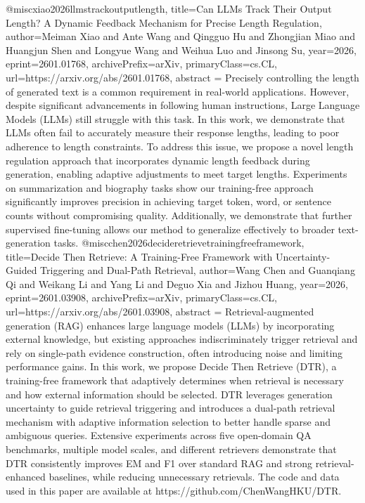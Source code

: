 {}@misc{xiao2026llmstrackoutputlength,
      title={Can LLMs Track Their Output Length? A Dynamic Feedback Mechanism for Precise Length Regulation}, 
      author={Meiman Xiao and Ante Wang and Qingguo Hu and Zhongjian Miao and Huangjun Shen and Longyue Wang and Weihua Luo and Jinsong Su},
      year={2026},
      eprint={2601.01768},
      archivePrefix={arXiv},
      primaryClass={cs.CL},
      url={https://arxiv.org/abs/2601.01768},
      abstract = {Precisely controlling the length of generated text is a common requirement in real-world applications. However, despite significant advancements in following human instructions, Large Language Models (LLMs) still struggle with this task. In this work, we demonstrate that LLMs often fail to accurately measure their response lengths, leading to poor adherence to length constraints. To address this issue, we propose a novel length regulation approach that incorporates dynamic length feedback during generation, enabling adaptive adjustments to meet target lengths. Experiments on summarization and biography tasks show our training-free approach significantly improves precision in achieving target token, word, or sentence counts without compromising quality. Additionally, we demonstrate that further supervised fine-tuning allows our method to generalize effectively to broader text-generation tasks.}
}@misc{chen2026decideretrievetrainingfreeframework,
      title={Decide Then Retrieve: A Training-Free Framework with Uncertainty-Guided Triggering and Dual-Path Retrieval}, 
      author={Wang Chen and Guanqiang Qi and Weikang Li and Yang Li and Deguo Xia and Jizhou Huang},
      year={2026},
      eprint={2601.03908},
      archivePrefix={arXiv},
      primaryClass={cs.CL},
      url={https://arxiv.org/abs/2601.03908},
      abstract = {Retrieval-augmented generation (RAG) enhances large language models (LLMs) by incorporating external knowledge, but existing approaches indiscriminately trigger retrieval and rely on single-path evidence construction, often introducing noise and limiting performance gains. In this work, we propose Decide Then Retrieve (DTR), a training-free framework that adaptively determines when retrieval is necessary and how external information should be selected. DTR leverages generation uncertainty to guide retrieval triggering and introduces a dual-path retrieval mechanism with adaptive information selection to better handle sparse and ambiguous queries. Extensive experiments across five open-domain QA benchmarks, multiple model scales, and different retrievers demonstrate that DTR consistently improves EM and F1 over standard RAG and strong retrieval-enhanced baselines, while reducing unnecessary retrievals. The code and data used in this paper are available at https://github.com/ChenWangHKU/DTR.}
}
